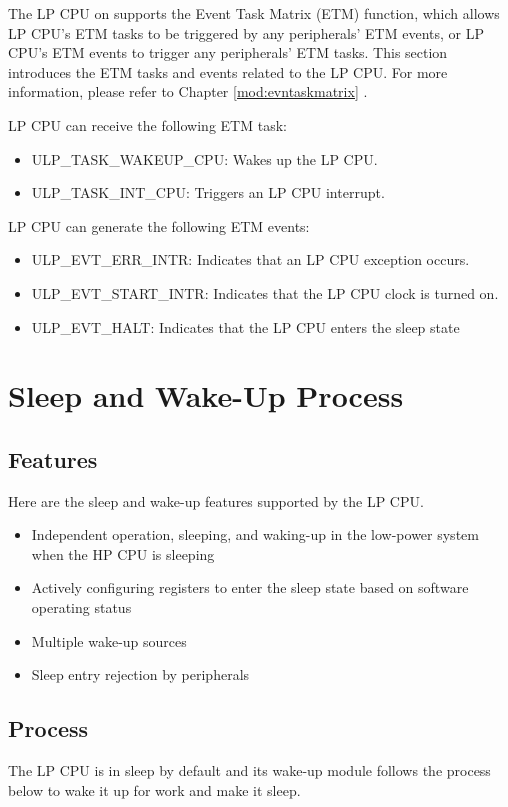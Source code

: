 \documentclass[main\_\_EN.tex]{subfiles}
\begin{document}
The LP CPU on \chipname{} supports the Event Task Matrix (ETM) function, which allows LP CPU's ETM tasks to be triggered by any peripherals' ETM events, or LP CPU's ETM events to trigger any peripherals' ETM tasks. This section introduces the ETM tasks and events related to the LP CPU. For more information, please refer to Chapter \ref{mod:evntaskmatrix} .

LP CPU can receive the following ETM task:

\begin{itemize}
   \item ULP\_TASK\_WAKEUP\_CPU: Wakes up the LP CPU.
   \item ULP\_TASK\_INT\_CPU: Triggers an LP CPU interrupt.
\end{itemize}

LP CPU can generate the following ETM events:

\begin{itemize}
   \item ULP\_EVT\_ERR\_INTR: Indicates that an LP CPU exception occurs.
   \item ULP\_EVT\_START\_INTR: Indicates that the LP CPU clock is turned on.
   \item ULP\_EVT\_HALT: Indicates that the LP CPU enters the sleep state
\end{itemize}

\section{Sleep and Wake-Up Process}\label{sec:sleep}
\subsection{Features}

Here are the sleep and wake-up features supported by the LP CPU.

\begin{itemize}
    \item Independent operation, sleeping, and waking-up in the low-power system when the HP CPU is sleeping
    \item Actively configuring registers to enter the sleep state based on software operating status
    \item Multiple wake-up sources
    \item Sleep entry rejection by peripherals
\end{itemize}

\subsection{Process}
The LP CPU is in sleep by default and its wake-up module follows the process below to wake it up for work and make it sleep.
\end{document}
